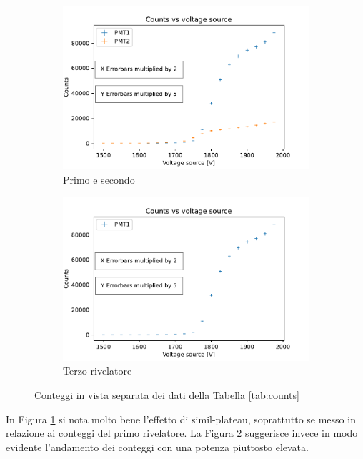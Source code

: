 \documentclass[10pt,a4paper]{article}
\begin{document}
\begin{figure}[h]
\begin{subfigure}{.48\columnwidth}
  \centering
  \includegraphics[width=\linewidth]{img/counts12_new.pdf}
  \caption{Primo e secondo}
  \label{fig:counts_12}
\end{subfigure}%
\hfill
\begin{subfigure}{.48\columnwidth}
  \centering
  \includegraphics[width=\linewidth]{img/counts1_new.pdf}
  \caption{Terzo rivelatore}
  \label{fig:counts_3}
\end{subfigure}
\caption{Conteggi in vista separata dei dati della Tabella \ref{tab:counts}}
\label{fig:counts_sep}
\end{figure}

In Figura \ref{fig:counts_12} si nota molto bene l'effetto di simil-plateau, soprattutto se messo in relazione ai conteggi del primo rivelatore. La Figura \ref{fig:counts_3} suggerisce invece in modo evidente l'andamento dei conteggi con una potenza piuttosto elevata. 
\end{document}
